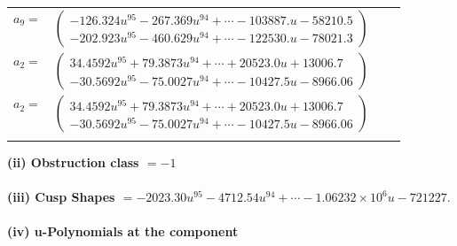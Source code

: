 \documentclass[1p]{elsarticle_modified}
\theoremstyle{definition}
\begin{document}
\begin{tabular}{m{7pt} m{180pt} m{7pt} m{180pt} }
\flushright $a_{9}=$&$\begin{pmatrix}-126.324 u^{95}-267.369 u^{94}+\cdots-103887. u-58210.5\\-202.923 u^{95}-460.629 u^{94}+\cdots-122530. u-78021.3\end{pmatrix}$ \\
\flushright $a_{2}=$&$\begin{pmatrix}34.4592 u^{95}+79.3873 u^{94}+\cdots+20523.0 u+13006.7\\-30.5692 u^{95}-75.0027 u^{94}+\cdots-10427.5 u-8966.06\end{pmatrix}$\\ \flushright $a_{2}=$&$\begin{pmatrix}34.4592 u^{95}+79.3873 u^{94}+\cdots+20523.0 u+13006.7\\-30.5692 u^{95}-75.0027 u^{94}+\cdots-10427.5 u-8966.06\end{pmatrix}$\\&\end{tabular}
\flushleft \textbf{(ii) Obstruction class $= -1$}\\~\\
\flushleft \textbf{(iii) Cusp Shapes $= -2023.30 u^{95}-4712.54 u^{94}+\cdots-1.06232\times10^{6} u-721227.$}\\~\\
\newpage\renewcommand{\arraystretch}{1}
\flushleft \textbf{(iv) u-Polynomials at the component}\newline \\
\end{document}
